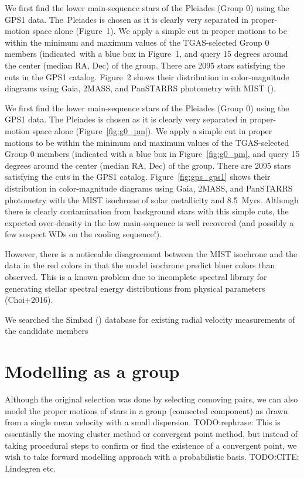 \documentclass[modern,letterpaper]{aastex61}
\newcommand{\todo}[1]{{\color{crimson}TODO:#1}}
\begin{document}
We first find the lower main-sequence stars of the Pleiades (Group 0) using the
GPS1 data. The Pleiades is chosen as it is clearly very separated in
proper-motion space alone (Figure 1). We apply a simple cut in proper motions
to be within the minimum and maximum values of the TGAS-selected Group 0
members (indicated with a blue box in Figure 1, and query 15 degrees around the
center (median RA, Dec) of the group. There are 2095 stars satisfying the cuts
in the GPS1 catalog. Figure 2 shows their distribution in color-magnitude
diagrams using Gaia, 2MASS, and PanSTARRS photometry with MIST (\citealt{2016ApJ...823..102C}).

We first find the lower main-sequence stars of the Pleiades (Group 0) using the
GPS1 data. The Pleiades is chosen as it is clearly very separated in
proper-motion space alone (Figure~\ref{fig:g0_pm}). We apply a simple cut in
proper motions to be within the minimum and maximum values of the TGAS-selected
Group 0 members (indicated with a blue box in Figure~\ref{fig:g0_pm}, and query 15
degrees around the center (median RA, Dec) of the group. There are 2095 stars
satisfying the cuts in the GPS1 catalog. Figure~\ref{fig:gps_gps1} shows their
distribution in color-magnitude diagrams using Gaia, 2MASS, and PanSTARRS
photometry with the MIST isochrone of solar metallicity and 8.5~Myrs. Although
there is clearly contamination from background stars with this simple cuts, the
expected over-density in the low main-sequence is well recovered (and possibly
a few suspect WDs on the cooling sequence!).

However, there is a noticeable disagreement between the MIST isochrone and the
data in the red colors in that the model isochrone predict bluer colors than
observed. This is a known problem due to incomplete spectral library for
generating stellar spectral energy distributions from physical parameters
(Choi+2016).


We searched the Simbad (\citealt{2000A&AS..143....9W}) database for existing
radial velocity measurements of the candidate members

\section{Modelling as a group}

Although the original selection was done by selecting comoving pairs, we can
also model the proper motions of stars in a group (connected component) as drawn
from a single mean velocity with a small dispersion.
\todo{rephrase:
This is essentially the moving cluster method or convergent point method,
but instead of taking procedural steps to confirm or find the existence of a
convergent point, we wish to take forward modelling approach with a probabilistic basis.}
\todo{CITE: Lindegren etc.}
\end{document}
